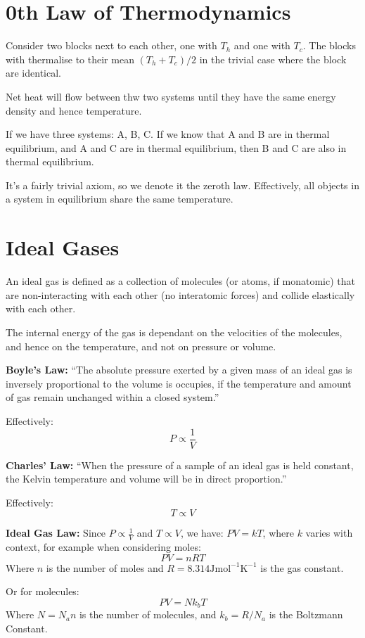 
\section{0th Law of Thermodynamics}
Consider two blocks next to each other, one with $T_h$ and one with $T_c$. The blocks with thermalise to their mean $(T_h + T_c) / 2$ in the trivial case where the block are identical.

Net heat will flow between thw two systems until they have the same energy density and hence temperature.

If we have three systems: A, B, C. If we know that A and B are in thermal equilibrium, and A and C are in thermal equilibrium, then B and C are also in thermal equilibrium.

It's a fairly trivial axiom, so we denote it the zeroth law. Effectively, all objects in a system in equilibrium share the same temperature.

\section{Ideal Gases}

\begin{tcolorbox}
    {\centering
An ideal gas is defined as a collection of molecules (or atoms, if monatomic) that are non-interacting with each other (no interatomic forces) and collide elastically with each other.

The internal energy of the gas is dependant on the velocities of the molecules, and hence on the temperature, and not on pressure or volume.
\par}
\end{tcolorbox}

\vspace{0.5cm}
\begin{tcolorbox}
    \textbf{Boyle's Law: } ``The absolute pressure exerted by a given mass of an ideal gas is inversely proportional to the volume is occupies, if the temperature and amount of gas remain unchanged within a closed system.''
\end{tcolorbox}
Effectively:
\[
    P \propto \frac{1}{V}
\]

\begin{tcolorbox}
\textbf{Charles' Law: } ``When the pressure of a sample of an ideal gas is held constant, the Kelvin temperature and volume will be in direct proportion.''
\end{tcolorbox}
Effectively:
\[
    T \propto V
\]
\begin{tcolorbox}
\textbf{Ideal Gas Law: } Since $P \propto \frac{1}{V}$ and $T \propto V$, we have: $PV = kT$, where $k$ varies with context, for example when considering moles:
\[
    \boxed{PV = nRT}
\]
Where $n$ is the number of moles and $R = 8.314 \text{J} \text{mol}^{-1} \text{K}^{-1}$ is the gas constant.


Or for molecules:
\[
    \boxed{PV = Nk_b T}
\]
Where $N = N_a n$ is the number of molecules, and $k_b = R/N_a$ is the Boltzmann Constant.
\end{tcolorbox}

